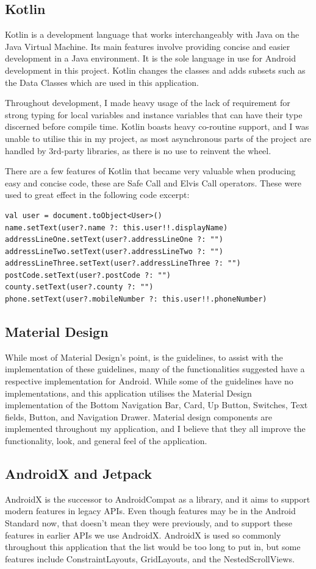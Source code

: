     \subsection{Kotlin}
    Kotlin is a development language that works interchangeably with Java on the Java Virtual Machine. Its main features involve providing concise and easier development in a Java environment. It is the sole language in use for Android development in this project. Kotlin changes the classes and adds subsets such as the Data Classes which are used in this application.
    
    Throughout development, I made heavy usage of the lack of requirement for strong typing for local variables and instance variables that can have their type discerned before compile time. Kotlin boasts heavy co-routine support, and I was unable to utilise this in my project, as most asynchronous parts of the project are handled by 3rd-party libraries, as there is no use to reinvent the wheel.
    
    There are a few features of Kotlin that became very valuable when producing easy and concise code, these are Safe Call and Elvis Call operators. These were used to great effect in the following code excerpt:
\begin{verbatim}
val user = document.toObject<User>()
name.setText(user?.name ?: this.user!!.displayName)
addressLineOne.setText(user?.addressLineOne ?: "")
addressLineTwo.setText(user?.addressLineTwo ?: "")
addressLineThree.setText(user?.addressLineThree ?: "")
postCode.setText(user?.postCode ?: "")
county.setText(user?.county ?: "")
phone.setText(user?.mobileNumber ?: this.user!!.phoneNumber)
\end{verbatim}
    
    \subsection{Material Design}
    While most of Material Design's point, is the guidelines, to assist with the implementation of these guidelines, many of the functionalities suggested have a respective implementation for Android. While some of the guidelines have no implementations, and this application utilises the Material Design implementation of the \gls{Bottom Navigation Bar}, \gls{Card}, \gls{Up Button}, Switches, Text fields, Button, and Navigation Drawer. Material design components are implemented throughout my application, and I believe that they all improve the functionality, look, and general feel of the application.
    \subsection{AndroidX and Jetpack}
        AndroidX is the successor to AndroidCompat as a library, and it aims to support modern features in legacy APIs. Even though features may be in the Android Standard now, that doesn't mean they were previously, and to support these features in earlier APIs we use AndroidX. AndroidX is used so commonly throughout this application that the list would be too long to put in, but some features include ConstraintLayouts, GridLayouts, and the NestedScrollViews.
        
